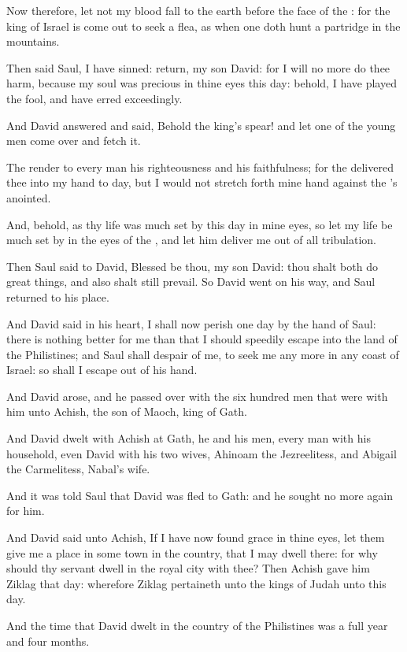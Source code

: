\Verse Now therefore, let not my blood fall to the earth before the face of the \LORD: for the king of Israel is come out to seek a flea, as when one doth hunt a partridge in the mountains.

\Verse Then said Saul, I have sinned: return, my son David: for I will no more do thee harm, because my soul was precious in thine eyes this day: behold, I have played the fool, and have erred exceedingly.

\Verse And David answered and said, Behold the king's spear! and let one of the young men come over and fetch it.

\Verse The \LORD render to every man his righteousness and his faithfulness; for the \LORD delivered thee into my hand to day, but I would not stretch forth mine hand against the \LORD's anointed.

\Verse And, behold, as thy life was much set by this day in mine eyes, so let my life be much set by in the eyes of the \LORD, and let him deliver me out of all tribulation.

\Verse Then Saul said to David, Blessed be thou, my son David: thou shalt both do great things, and also shalt still prevail. So David went on his way, and Saul returned to his place.


\Chapter
\Verse And David said in his heart, I shall now perish one day by the hand of Saul: there is nothing better for me than that I should speedily escape into the land of the Philistines; and Saul shall despair of me, to seek me any more in any coast of Israel: so shall I escape out of his hand.

\Verse And David arose, and he passed over with the six hundred men that were with him unto Achish, the son of Maoch, king of Gath.

\Verse And David dwelt with Achish at Gath, he and his men, every man with his household, even David with his two wives, Ahinoam the Jezreelitess, and Abigail the Carmelitess, Nabal's wife.

\Verse And it was told Saul that David was fled to Gath: and he sought no more again for him.

\Verse And David said unto Achish, If I have now found grace in thine eyes, let them give me a place in some town in the country, that I may dwell there: for why should thy servant dwell in the royal city with thee?  \Verse Then Achish gave him Ziklag that day: wherefore Ziklag pertaineth unto the kings of Judah unto this day.

\Verse And the time that David dwelt in the country of the Philistines was a full year and four months.

